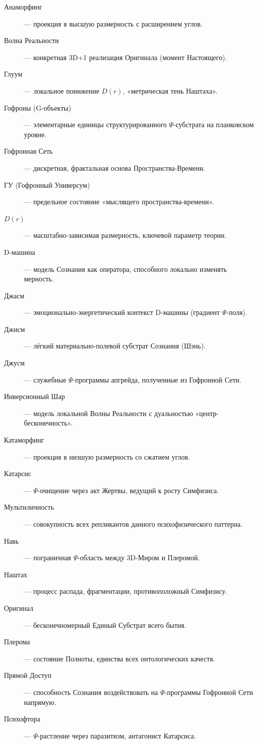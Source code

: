\documentclass[a4paper,12pt]{article}
\begin{document}
\begin{description}
	\item[Анаморфинг] — проекция в высшую размерность с расширением углов.
	\item[Волна Реальности] — конкретная 3D+1 реализация Оригинала (момент Настоящего).
	\item[Глуум] — локальное понижение $D(r)$, «метрическая тень Наштаха».
	\item[Гофроны (G-объекты)] — элементарные единицы структурированного $\Psi$-субстрата на планковском уровне.
	\item[Гофронная Сеть] — дискретная, фрактальная основа Пространства-Времени.
	\item[ГУ (Гофронный Универсум)] — предельное состояние «мыслящего пространства-времени».
	\item[$D(r)$] — масштабно-зависимая размерность, ключевой параметр теории.
	\item[D-машина] — модель Сознания как оператора, способного локально изменять мерность.
	\item[Джасм] — эмоционально-энергетический контекст D-машины (градиент $\Psi$-поля).
	\item[Джисм] — лёгкий материально-полевой субстрат Сознания (Шэнь).
	\item[Джусм] — служебные $\Psi$-программы апгрейда, полученные из Гофронной Сети.
	\item[Инверсионный Шар] — модель локальной Волны Реальности с дуальностью «центр-бесконечность».
	\item[Катаморфинг] — проекция в низшую размерность со сжатием углов.
	\item[Катарсис] — $\Psi$-очищение через акт Жертвы, ведущий к росту Симфизиса.
	\item[Мультиличность] — совокупность всех репликантов данного психофизического паттерна.
	\item[Навь] — пограничная $\Psi$-область между 3D-Миром и Плеромой.
	\item[Наштах] — процесс распада, фрагментации, противоположный Симфизису.
	\item[Оригинал] — бесконечномерный Единый Субстрат всего бытия.
	\item[Плерома] — состояние Полноты, единства всех онтологических качеств.
	\item[Прямой Доступ] — способность Сознания воздействовать на $\Psi$-программы Гофронной Сети напрямую.
	\item[Психофтора] — $\Psi$-растление через паразитизм, антагонист Катарсиса.

\end{description}
\end{document}
